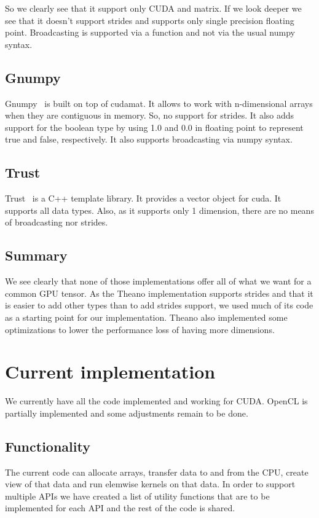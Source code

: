 \documentclass{article} %
\begin{document}
So we clearly see that it support only CUDA and matrix. If we look deeper we see that it doesn't support strides and supports only single precision floating point. Broadcasting is supported via a function and not via the usual numpy syntax.

\subsection{Gnumpy}
Gnumpy~\citep{gnumpy-TR2010} is built on top of cudamat. It allows to work with n-dimensional arrays when they are contiguous in memory. So, no support for strides. It also adds support for the boolean type by using 1.0 and 0.0 in floating point to represent true and false, respectively. It also supports broadcasting via numpy syntax.

\subsection{Trust}
Trust~\citep{Thrust} is a C++ template library. It provides a vector object for cuda. It supports all data types.  Also, as it supports only 1 dimension, there are no means of broadcasting nor strides.

\subsection{Summary}
We see clearly that none of those implementations offer all of what we want for a common GPU tensor. As the Theano implementation supports strides and that it is easier to add other types than to add strides support, we used much of its code as a starting point for our implementation. Theano also implemented some optimizations to lower the performance loss of having more dimensions.

\section{Current implementation}

We currently have all the code implemented and working for CUDA.
OpenCL is partially implemented and some adjustments remain to be done.

\subsection{Functionality}

The current code can allocate arrays, transfer data to and from the CPU, create view of that data and run elemwise kernels on that data.  In order to support multiple APIs we have created a list of utility functions that are to be implemented for each API and the rest of the code is shared.
\end{document}
